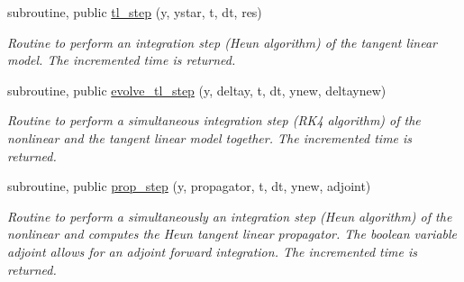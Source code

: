 \begin{DoxyCompactItemize}
subroutine, public \hyperlink{namespacetl__ad__integrator_ac88b155557d4fc0bae70007fde3aef06}{tl\+\_\+step} (y, ystar, t, dt, res)
\begin{DoxyCompactList}\small\item\em Routine to perform an integration step (Heun algorithm) of the tangent linear model. The incremented time is returned. \end{DoxyCompactList}\item 
subroutine, public \hyperlink{namespacetl__ad__integrator_a9fb60b4a88b0c5d6ca27b58440a32f74}{evolve\+\_\+tl\+\_\+step} (y, deltay, t, dt, ynew, deltaynew)
\begin{DoxyCompactList}\small\item\em Routine to perform a simultaneous integration step (R\+K4 algorithm) of the nonlinear and the tangent linear model together. The incremented time is returned. \end{DoxyCompactList}\item 
subroutine, public \hyperlink{namespacetl__ad__integrator_a76538a8bd594899e94228abaa34b48cd}{prop\+\_\+step} (y, propagator, t, dt, ynew, adjoint)
\begin{DoxyCompactList}\small\item\em Routine to perform a simultaneously an integration step (Heun algorithm) of the nonlinear and computes the Heun tangent linear propagator. The boolean variable adjoint allows for an adjoint forward integration. The incremented time is returned. \end{DoxyCompactList}\end{DoxyCompactItemize}
